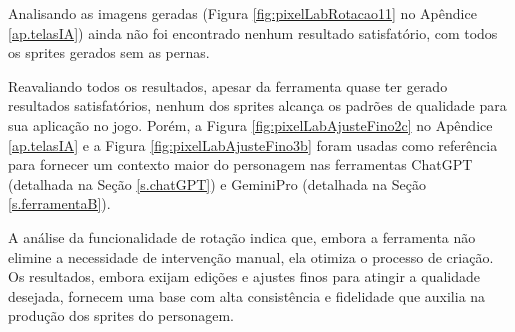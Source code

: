 \begin{figure}[htbp]
\end{figure}

Analisando as imagens geradas (Figura \ref{fig:pixelLabRotacao11} no Apêndice \ref{ap.telasIA}) ainda não foi encontrado nenhum resultado satisfatório, com todos os sprites gerados sem as pernas.

Reavaliando todos os resultados, apesar da ferramenta quase ter gerado resultados satisfatórios, nenhum dos sprites alcança os padrões de qualidade para sua aplicação no jogo. Porém, a Figura \ref{fig:pixelLabAjusteFino2c} no Apêndice \ref{ap.telasIA} e a Figura  \ref{fig:pixelLabAjusteFino3b} foram usadas como referência para fornecer um contexto maior do personagem nas ferramentas ChatGPT (detalhada na Seção \ref{s.chatGPT}) e GeminiPro (detalhada na Seção \ref{s.ferramentaB}).

A análise da funcionalidade de rotação indica que, embora a ferramenta não elimine a necessidade de intervenção manual, ela otimiza o processo de criação. Os resultados, embora exijam edições e ajustes finos para atingir a qualidade desejada, fornecem uma base com alta consistência e fidelidade que auxilia na produção dos sprites do personagem.

